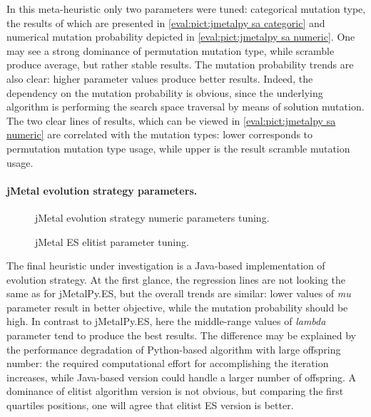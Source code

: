 In this meta-heuristic only two parameters were tuned: categorical mutation type, the results of which are presented in \cref{eval:pict:jmetalpy sa categoric} and numerical mutation probability depicted in \cref{eval:pict:jmetalpy sa numeric}. One may see a strong dominance of permutation mutation type, while scramble produce average, but rather stable results. The mutation probability trends are also clear: higher parameter values produce better results. Indeed, the dependency on the mutation probability is obvious, since the underlying algorithm is performing the search space traversal by means of solution mutation. The two clear lines of results, which can be viewed in \cref{eval:pict:jmetalpy sa numeric} are correlated with the mutation types: lower corresponds to permutation mutation type usage, while upper is the result scramble mutation usage.


\paragraph{jMetal evolution strategy parameters.}
\begin{figure}[h]
	\centering
	\vspace{-10pt}
	
	\caption{jMetal evolution strategy numeric parameters tuning.}
	\vspace{-15pt}
	\label{eval:pict:jmetal es numeric}
\end{figure}

\begin{wrapfigure}{R}{0.5\textwidth}
	\centering
	\vspace{-20pt}
	
	\label{eval:pict:jmetal es categoric}
	\caption{jMetal ES elitist parameter tuning.}
	\vspace{-30pt}
\end{wrapfigure}

The final heuristic under investigation is a Java-based implementation of evolution strategy. At the first glance, the regression lines are not looking the same as for jMetalPy.ES, but the overall trends are similar: lower values of \emph{mu} parameter result in better objective, while the mutation probability should be high. In contrast to jMetalPy.ES, here the middle-range values of \emph{lambda} parameter tend to produce the best results. The difference may be explained by the performance degradation of Python-based algorithm with large offspring number: the required computational effort for accomplishing the iteration increases, while Java-based version could handle a larger number of offspring. A dominance of elitist algorithm version is not obvious, but comparing the first quartiles positions, one will agree that elitist ES version is better.

